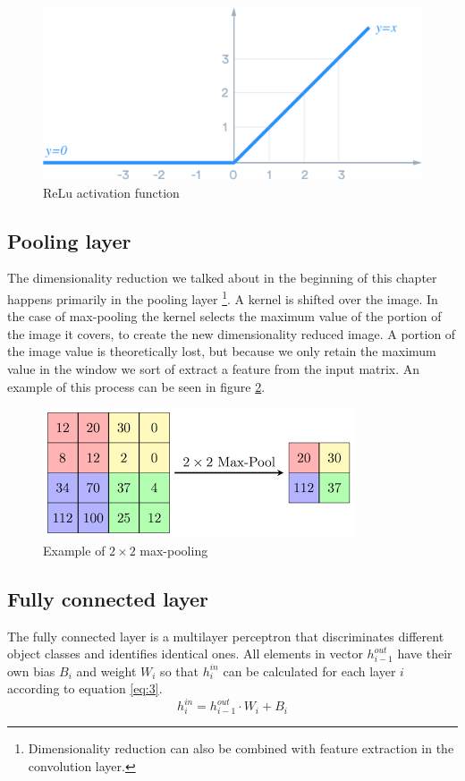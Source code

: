\begin{figure}[H]
  \center
  \includegraphics[scale=0.3]{plots/relu.png}
  \caption{ReLu activation function}
  \label{fig:relu}
\end{figure}

\subsection{Pooling layer}
The dimensionality reduction we talked about in the beginning of this chapter happens primarily in the pooling layer \footnote{Dimensionality reduction can also be combined with feature extraction in the convolution layer.}. A kernel is shifted over the image. In the case of max-pooling the kernel selects the maximum value of the portion of the image it covers, to create the new dimensionality reduced image. A portion of the image value is theoretically lost, but because we only retain the maximum value in the window we sort of extract a feature from the input matrix. An example of this process can be seen in figure \ref{fig:pooling}.
\begin{figure}[H]
  \center
  \includegraphics[scale=0.75]{fig/maxpool.png}
  \caption{Example of $2\times2$ max-pooling}
  \label{fig:pooling}
\end{figure}

\subsection{Fully connected layer}
The fully connected layer is a multilayer perceptron that discriminates different object classes and identifies identical ones. All elements in vector $h_{i-1}^{out}$ have their own bias $B_i$ and weight $W_i$ so that $h_i^{in}$ can be calculated for each layer $i$ according to equation \ref{eq:3}.
\begin{equation} \label{eq:3}
  h_i^{in} = h_{i-1}^{out} \cdot W_i + B_i
\end{equation}

